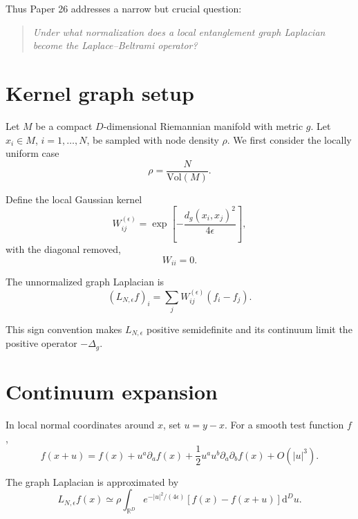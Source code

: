 \documentclass[11pt,a4paper]{article}
\newcommand{\dd}{\mathrm d}
\newcommand{\Vol}{\mathrm{Vol}}
\begin{document}
Thus Paper 26 addresses a narrow but crucial question:

\begin{quote}
\emph{Under what normalization does a local entanglement graph Laplacian become
the Laplace--Beltrami operator?}
\end{quote}

\section{Kernel graph setup}

Let \(M\) be a compact \(D\)-dimensional Riemannian manifold with metric \(g\).
Let \(x_i\in M\), \(i=1,\dots,N\), be sampled with node density \(\rho\). We first
consider the locally uniform case
\begin{equation}
\rho=\frac{N}{\Vol(M)}.
\end{equation}

Define the local Gaussian kernel
\begin{equation}
W_{ij}^{(\epsilon)}
=
\exp\left[
-\frac{d_g(x_i,x_j)^2}{4\epsilon}
\right],
\end{equation}
with the diagonal removed,
\begin{equation}
W_{ii}=0.
\end{equation}

The unnormalized graph Laplacian is
\begin{equation}
(L_{N,\epsilon}f)_i
=
\sum_j W_{ij}^{(\epsilon)}(f_i-f_j).
\end{equation}

This sign convention makes \(L_{N,\epsilon}\) positive semidefinite and its
continuum limit the positive operator \(-\Delta_g\).

\section{Continuum expansion}

In local normal coordinates around \(x\), set \(u=y-x\). For a smooth test
function \(f\),
\begin{equation}
f(x+u)
=
f(x)
+
u^a\partial_a f(x)
+
\frac12 u^a u^b\partial_a\partial_b f(x)
+
O(|u|^3).
\end{equation}

The graph Laplacian is approximated by
\begin{equation}
L_{N,\epsilon}f(x)
\simeq
\rho
\int_{\mathbb R^D}
e^{-|u|^2/(4\epsilon)}
\left[
f(x)-f(x+u)
\right]\dd^D u.
\end{equation}
\end{document}
